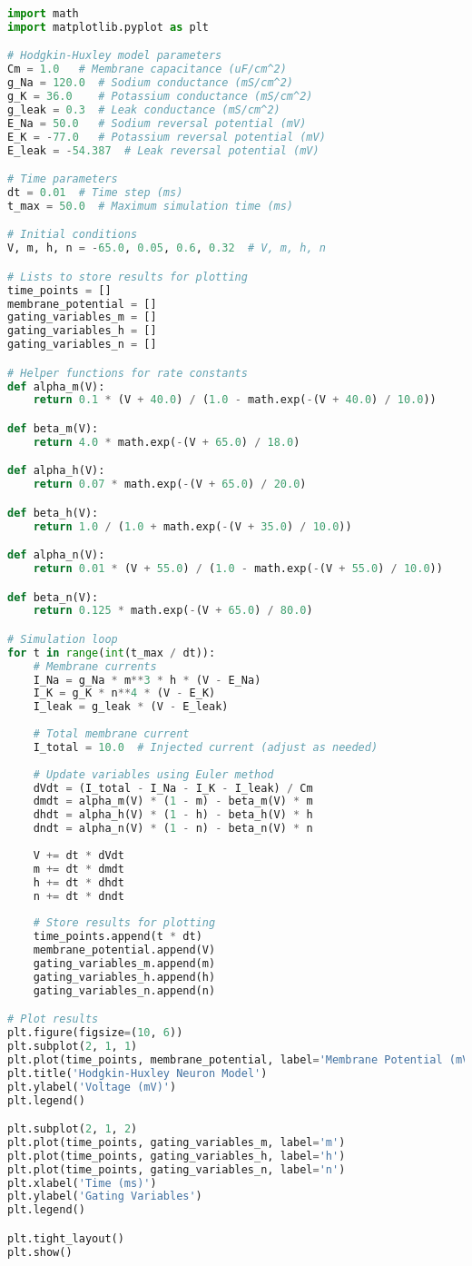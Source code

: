 \begin{lstlisting}[language=Python, caption={Full implementation of a Hodkin-Huxley neuron}]
import math
import matplotlib.pyplot as plt

# Hodgkin-Huxley model parameters
Cm = 1.0   # Membrane capacitance (uF/cm^2)
g_Na = 120.0  # Sodium conductance (mS/cm^2)
g_K = 36.0    # Potassium conductance (mS/cm^2)
g_leak = 0.3  # Leak conductance (mS/cm^2)
E_Na = 50.0   # Sodium reversal potential (mV)
E_K = -77.0   # Potassium reversal potential (mV)
E_leak = -54.387  # Leak reversal potential (mV)

# Time parameters
dt = 0.01  # Time step (ms)
t_max = 50.0  # Maximum simulation time (ms)

# Initial conditions
V, m, h, n = -65.0, 0.05, 0.6, 0.32  # V, m, h, n

# Lists to store results for plotting
time_points = []
membrane_potential = []
gating_variables_m = []
gating_variables_h = []
gating_variables_n = []

# Helper functions for rate constants
def alpha_m(V):
	return 0.1 * (V + 40.0) / (1.0 - math.exp(-(V + 40.0) / 10.0))

def beta_m(V):
	return 4.0 * math.exp(-(V + 65.0) / 18.0)

def alpha_h(V):
	return 0.07 * math.exp(-(V + 65.0) / 20.0)

def beta_h(V):
	return 1.0 / (1.0 + math.exp(-(V + 35.0) / 10.0))

def alpha_n(V):
	return 0.01 * (V + 55.0) / (1.0 - math.exp(-(V + 55.0) / 10.0))

def beta_n(V):
	return 0.125 * math.exp(-(V + 65.0) / 80.0)

# Simulation loop
for t in range(int(t_max / dt)):
	# Membrane currents
	I_Na = g_Na * m**3 * h * (V - E_Na)
	I_K = g_K * n**4 * (V - E_K)
	I_leak = g_leak * (V - E_leak)
	
	# Total membrane current
	I_total = 10.0  # Injected current (adjust as needed)
	
	# Update variables using Euler method
	dVdt = (I_total - I_Na - I_K - I_leak) / Cm
	dmdt = alpha_m(V) * (1 - m) - beta_m(V) * m
	dhdt = alpha_h(V) * (1 - h) - beta_h(V) * h
	dndt = alpha_n(V) * (1 - n) - beta_n(V) * n
	
	V += dt * dVdt
	m += dt * dmdt
	h += dt * dhdt
	n += dt * dndt
	
	# Store results for plotting
	time_points.append(t * dt)
	membrane_potential.append(V)
	gating_variables_m.append(m)
	gating_variables_h.append(h)
	gating_variables_n.append(n)

# Plot results
plt.figure(figsize=(10, 6))
plt.subplot(2, 1, 1)
plt.plot(time_points, membrane_potential, label='Membrane Potential (mV)')
plt.title('Hodgkin-Huxley Neuron Model')
plt.ylabel('Voltage (mV)')
plt.legend()

plt.subplot(2, 1, 2)
plt.plot(time_points, gating_variables_m, label='m')
plt.plot(time_points, gating_variables_h, label='h')
plt.plot(time_points, gating_variables_n, label='n')
plt.xlabel('Time (ms)')
plt.ylabel('Gating Variables')
plt.legend()

plt.tight_layout()
plt.show()

\end{lstlisting}

